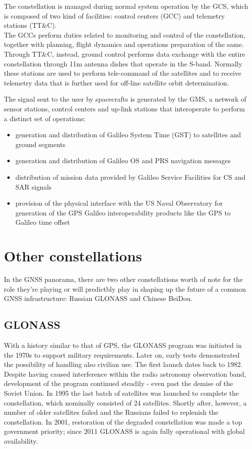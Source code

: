 The constellation is managed during normal system operation by the GCS, which is
composed of two kind of facilities: control centers (GCC) and telemetry stations
(TT\&C). \\
The GCCs perform duties related to monitoring and control of the
constellation, together with planning, flight dynamics and operations
preparation of the same.\\
Through TT\&C, instead, ground control performs data exchange with the entire
constellation through 11m antenna dishes that operate in the S-band. Normally
these stations are used to perform tele-command of the satellites and to receive
telemetry data that is further used for off-line satellite orbit determination.

The signal sent to the user by spacecrafts is generated by the GMS, a network of
sensor stations, control centers and up-link stations that interoperate to
perform a distinct set of operations:
\begin{itemize}
  \item generation and distribution of Galileo System Time (GST) to satellites
    and ground segments
  \item generation and distribution of Galileo OS and PRS navigation messages
  \item distribution of mission data provided by Galileo Service Facilities for
    CS and SAR signals
  \item provision of the physical interface with the US Naval Observatory for
    generation of the GPS Galileo interoperability products like the GPS to
    Galileo time offset
\end{itemize}

\section{Other constellations}
In the GNSS panorama, there are two other constellations worth of note for the
role they're playing or will predictbly play in shaping up the future of a
common GNSS infrastructure: Russian GLONASS and Chinese BeiDou.

\subsection{GLONASS}
With a history similar to that of GPS, the GLONASS program was initiated in the
1970s to support military requirements. Later on, early tests demonstrated the
possibility of handling also civilian use. The first launch dates back to 1982.
Despite having caused interference within the radio astronomy observation band,
development of the program continued steadily - even past the demise of the
Soviet Union. In 1995 the last batch of satellites was launched to complete the
constellation, which nominally consisted of 24 satellites. Shortly after,
however, a number of older satellites failed and the Russians failed to
replenish the constellation. In 2001, restoration of the degraded constellation
was made a top government priority; since 2011 GLONASS is again fully
operational with global availability.

